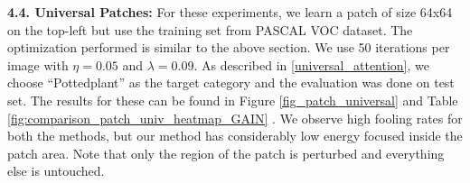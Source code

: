\documentclass[10pt,twocolumn,letterpaper]{article}
\begin{document}

{\bf 4.4. Universal Patches:}
For these experiments, we learn a patch of size 64x64 on the top-left but use the training set from PASCAL VOC dataset. The optimization performed is similar to the above section. We use 50 iterations per image with $\eta=0.05$ and $\lambda = 0.09$. As described in \ref{universal_attention}, we choose ``Pottedplant'' as the target category and the evaluation was done on test set. The results for these can be found in Figure \ref{fig_patch_universal} and Table \ref{fig:comparison_patch_univ_heatmap_GAIN} . We observe high fooling rates for both the methods, but our method has considerably low energy focused inside the patch area. Note that only the region of the patch is perturbed and everything else is untouched.
\end{document}
